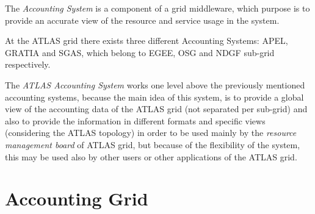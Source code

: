


The {\itshape Accounting System} is a component of a grid middleware,
which purpose is to provide an accurate view of the resource and
service usage in the system. 

At the ATLAS grid there exists three different Accounting Systems:
APEL, GRATIA and SGAS, which belong to EGEE, OSG and NDGF sub-grid
respectively.

The {\itshape ATLAS Accounting System} works one level above the
previously mentioned accounting systems, because the main idea of this
system, is to provide a global view of the accounting data of the
ATLAS grid (not separated per sub-grid) and also to provide the
information in different formats and specific views (considering the
ATLAS topology) in order to be used mainly by the {\itshape resource
management board} of ATLAS grid, but because of the flexibility of the
system, this may be used also by other users or other applications of
the ATLAS grid.




\section{Accounting Grid}

